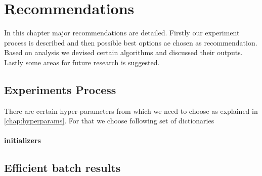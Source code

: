 
\newcommand{\BibTeX}{Bib\TeX}

\chapter{Recommendations}\label{chap:recommendations}

In this chapter major recommendations are detailed. Firstly our experiment process is described and then possible best options ae chosen as recommendation.
Based on analysis we devised certain algorithms and discussed their outputs. Lastly some areas for future research is suggested.

\section{Experiments Process}
There are certain hyper-parameters from which we need to choose as explained in \ref{chap:hyperparams}. For that we choose following set of dictionaries

\subsubsection{initializers}


\section{Efficient batch results}



